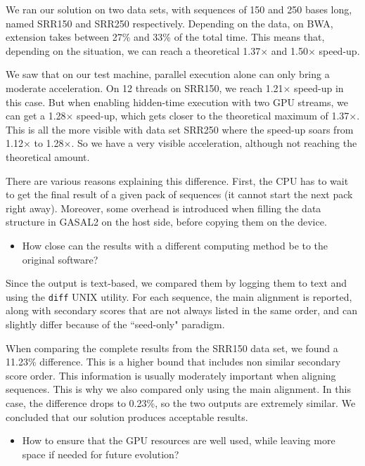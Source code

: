 We ran our solution on two data sets, with sequences of 150 and 250 bases long, named SRR150 and SRR250 respectively. Depending on the data, on BWA, extension takes between 27\% and 33\% of the total time. This means that, depending on the situation, we can reach a theoretical 1.37$\times$ and 1.50$\times$ speed-up.

We saw that on our test machine, parallel execution alone can only bring a moderate acceleration. On 12 threads on SRR150, we reach 1.21$\times$ speed-up in this case. But when enabling hidden-time execution with two GPU streams, we can get a 1.28$\times$ speed-up, which gets closer to the theoretical maximum of 1.37$\times$. This is all the more visible with data set SRR250 where the speed-up soars from 1.12$\times$ to 1.28$\times$. So we have a very visible acceleration, although not reaching the theoretical amount. 

There are various reasons explaining this difference. First, the CPU has to wait to get the final result of a given pack of sequences (it cannot start the next pack right away). Moreover, some overhead is introduced when filling the data structure in GASAL2 on the host side, before copying them on the device.

\begin{itemize}
	\item How close can the results with a different computing method be to the original software?
\end{itemize}

Since the output is text-based, we compared them by logging them to text and using the \verb|diff| UNIX utility. For each sequence, the main alignment is reported, along with secondary scores that are not always listed in the same order, and can slightly differ because of the ``seed-only" paradigm.

When comparing the complete results from the SRR150 data set, we found a 11.23\% difference. This is a higher bound that includes non similar secondary score order. This information is usually moderately important when aligning sequences. This is why we also compared only using the main alignment. In this case, the difference drops to 0.23\%, so the two outputs are extremely similar. We concluded that our solution produces acceptable results.

\begin{itemize}
	\item How to ensure that the GPU resources are well used, while leaving more space if needed for future evolution?
\end{itemize}


